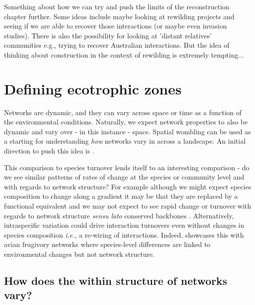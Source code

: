 Something about how we can try and push the limits of the reconstruction
chapter further. Some ideas include maybe looking at rewilding projects
and seeing if we are able to recover those interactions (or maybe even 
invasion studies). There is also the possibility for looking at 'distant
relatives' communities e.g., trying to recover Australian interactions.
But the idea of thinking about construction in the context of rewilding
is extremely tempting...

\section{Defining ecotrophic zones}

Networks are dynamic, and they can vary across space
\cite{Golubski2016EcoNet, Vazquez2007SpeAbu} or time
\cite{Poisot2015SpeWhy, Trojelsgaard2016EcoNet} as a function of the
environmental conditions. Naturally, we expect network properties to
also be dynamic and vary over - in this instance - space. Spatial
wombling can be used as a starting for understanding \emph{how} networks
vary in across a landscape. An initial direction to push this idea is . 

This comparison to species turnover
lends itself to an interesting comparison - do we see similar patterns
of rates of change at the species or community level and with regards to
network structure? For example although we might expect species
composition to change along a gradient it may be that they are replaced
by a functional equivalent and we may not expect to see rapid change or
turnover with regards to network structure \emph{sensu lato} conserved
backbones \cite{Mora2018IdeCom}. Alternatively, intraspecific variation
could drive interaction turnovers even without changes in species
composition \cite{Bolnick2011WhyInt} \emph{i.e.,} a re-wiring of
interactions. Indeed, \cite{Martins2022Global} showcases this with avian
frugivory networks where species-level differences are linked to environmental
changes but not network structure.

\subsection{How does the within structure of networks vary?}

